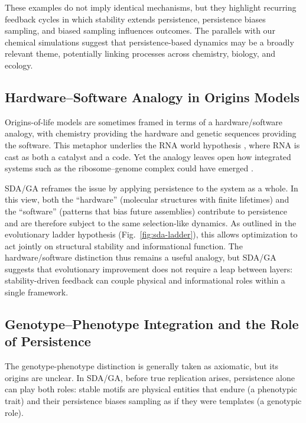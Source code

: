 \documentclass[life,article,submit,pdftex,moreauthors]{Definitions/mdpi}
\begin{document}
These examples do not imply identical mechanisms, but they highlight recurring feedback cycles in which stability extends persistence, persistence biases sampling, and biased sampling influences outcomes.  
The parallels with our chemical simulations suggest that persistence-based dynamics may be a broadly relevant theme, potentially linking processes across chemistry, biology, and ecology.


\subsection{Hardware–Software Analogy in Origins Models}

Origins-of-life models are sometimes framed in terms of a hardware/software analogy, 
with chemistry providing the hardware \cite{fontana1991algorithmic, cronin2024chemputation} and genetic sequences providing the software. This metaphor underlies the RNA world hypothesis \cite{gesteland2006rna}, where RNA is cast as both a catalyst and a code. 
Yet the analogy leaves open how integrated systems such as the ribosome–genome complex could have emerged \cite{maynardsmith1999origins}. 

SDA/GA reframes the issue by applying persistence to the system as a whole.  
In this view, both the “hardware” (molecular structures with finite lifetimes) 
and the “software” (patterns that bias future assemblies) contribute to persistence 
and are therefore subject to the same selection-like dynamics.  
As outlined in the evolutionary ladder hypothesis (Fig.~\ref{fig:sda-ladder}), 
this allows optimization to act jointly on structural stability and informational function.  
The hardware/software distinction thus remains a useful analogy, but SDA/GA suggests 
that evolutionary improvement does not require a leap between layers: stability-driven 
feedback can couple physical and informational roles within a single framework.


\subsection{Genotype–Phenotype Integration and the Role of Persistence}

The genotype-phenotype distinction is generally taken as axiomatic, but its origins are unclear.  
In SDA/GA, before true replication arises, persistence alone can play both roles:
stable motifs are physical entities that endure (a phenotypic trait) and their persistence biases sampling
as if they were templates (a genotypic role).  
\end{document}
